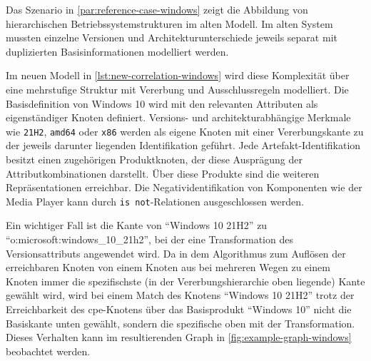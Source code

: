 Das Szenario in \autoref{par:reference-case-windows} zeigt die Abbildung von hierarchischen Betriebssystemstrukturen im alten Modell.
Im alten System mussten einzelne Versionen und Architekturunterschiede jeweils separat mit duplizierten Basisinformationen modelliert werden.

Im neuen Modell in \autoref{lst:new-correlation-windows} wird diese Komplexität über eine mehrstufige Struktur mit Vererbung und Ausschlussregeln modelliert.
Die Basisdefinition von Windows 10 wird mit den relevanten Attributen als eigenständiger Knoten definiert.
Versions- und architekturabhängige Merkmale wie \texttt{21H2}, \texttt{amd64} oder \texttt{x86} werden als eigene Knoten mit einer Vererbungskante zu der jeweils darunter liegenden Identifikation geführt.
Jede Artefakt-Identifikation besitzt einen zugehörigen Produktknoten, der diese Ausprägung der Attributkombinationen darstellt.
Über diese Produkte sind die weiteren Repräsentationen erreichbar.
Die Negatividentifikation von Komponenten wie der Media Player kann durch \texttt{is not}-Relationen ausgeschlossen werden.

Ein wichtiger Fall ist die Kante von \enquote{Windows 10 21H2} zu \enquote{o:microsoft:windows\_10\_21h2}, bei der eine Transformation des Versionsattributs angewendet wird.
Da in dem Algorithmus zum Auflösen der erreichbaren Knoten von einem Knoten aus bei mehreren Wegen zu einem Knoten immer die spezifischste (in der Vererbungshierarchie oben liegende) Kante gewählt wird, wird bei einem Match des Knotens \enquote{Windows 10 21H2} trotz der Erreichbarkeit des \acrshort{cpe}-Knotens über das Basisprodukt \enquote{Windows 10} nicht die Basiskante unten gewählt, sondern die spezifische oben mit der Transformation.
Dieses Verhalten kann im resultierenden Graph in \autoref{fig:example-graph-windows} beobachtet werden.

